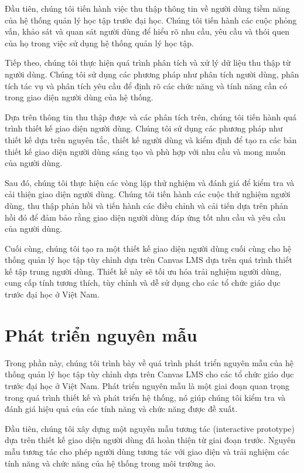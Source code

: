 \documentclass[../Thesis.tex]{subfiles}
\begin{document}
Đầu tiên, chúng tôi tiến hành việc thu thập thông tin về người dùng tiềm năng của hệ thống quản lý học tập trước đại học. Chúng tôi tiến hành các cuộc phỏng vấn, khảo sát và quan sát người dùng để hiểu rõ nhu cầu, yêu cầu và thói quen của họ trong việc sử dụng hệ thống quản lý học tập.

Tiếp theo, chúng tôi thực hiện quá trình phân tích và xử lý dữ liệu thu thập từ người dùng. Chúng tôi sử dụng các phương pháp như phân tích người dùng, phân tích tác vụ và phân tích yêu cầu để định rõ các chức năng và tính năng cần có trong giao diện người dùng của hệ thống.

Dựa trên thông tin thu thập được và các phân tích trên, chúng tôi tiến hành quá trình thiết kế giao diện người dùng. Chúng tôi sử dụng các phương pháp như thiết kế dựa trên nguyên tắc, thiết kế người dùng và kiểm định để tạo ra các bản thiết kế giao diện người dùng sáng tạo và phù hợp với nhu cầu và mong muốn của người dùng.

Sau đó, chúng tôi thực hiện các vòng lặp thử nghiệm và đánh giá để kiểm tra và cải thiện giao diện người dùng. Chúng tôi tiến hành các cuộc thử nghiệm người dùng, thu thập phản hồi và tiến hành các điều chỉnh và cải tiến dựa trên phản hồi đó để đảm bảo rằng giao diện người dùng đáp ứng tốt nhu cầu và yêu cầu của người dùng.

Cuối cùng, chúng tôi tạo ra một thiết kế giao diện người dùng cuối cùng cho hệ thống quản lý học tập tùy chỉnh dựa trên Canvas LMS dựa trên quá trình thiết kế tập trung người dùng. Thiết kế này sẽ tối ưu hóa trải nghiệm người dùng, cung cấp tính tương thích, tùy chỉnh và dễ sử dụng cho các tổ chức giáo dục trước đại học ở Việt Nam.

\section{Phát triển nguyên mẫu}
Trong phần này, chúng tôi trình bày về quá trình phát triển nguyên mẫu của hệ thống quản lý học tập tùy chỉnh dựa trên Canvas LMS cho các tổ chức giáo dục trước đại học ở Việt Nam. Phát triển nguyên mẫu là một giai đoạn quan trọng trong quá trình thiết kế và phát triển hệ thống, nó giúp chúng tôi kiểm tra và đánh giá hiệu quả của các tính năng và chức năng được đề xuất.

Đầu tiên, chúng tôi xây dựng một nguyên mẫu tương tác (interactive prototype) dựa trên thiết kế giao diện người dùng đã hoàn thiện từ giai đoạn trước. Nguyên mẫu tương tác cho phép người dùng tương tác với giao diện và trải nghiệm các tính năng và chức năng của hệ thống trong môi trường ảo.
\end{document}
